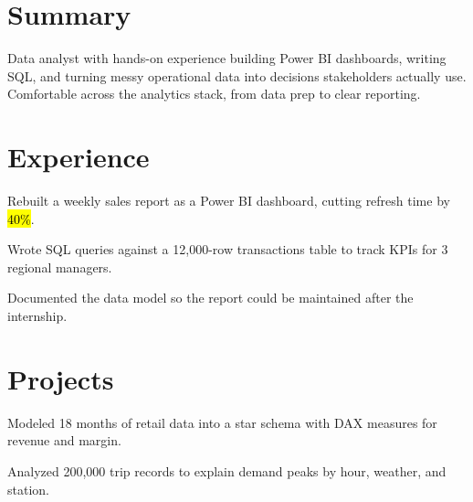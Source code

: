 \documentclass[10pt,a4paper]{article}
\begin{document}

\section{Summary}
Data analyst with hands-on experience building Power BI dashboards, writing SQL,
and turning messy operational data into decisions stakeholders actually use.
Comfortable across the analytics stack, from data prep to clear reporting.

\section{Experience}
\begin{cvitems}
  \item Rebuilt a weekly sales report as a Power BI dashboard, cutting refresh time by \hl{40\%}.
  \item Wrote SQL queries against a 12{,}000-row transactions table to track KPIs for 3 regional managers.
  \item Documented the data model so the report could be maintained after the internship.
\end{cvitems}

\section{Projects}
\begin{cvitems}
  \item Modeled 18 months of retail data into a star schema with DAX measures for revenue and margin.
\end{cvitems}

\begin{cvitems}
  \item Analyzed 200{,}000 trip records to explain demand peaks by hour, weather, and station.
\end{cvitems}
\end{document}
